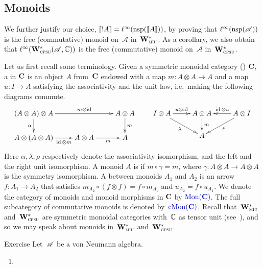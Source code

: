 \documentclass[a]{subfiles}
\begin{document}
\subsection{Monoids}
\label{sec:monoids-in-vna}
\begin{parsec}%
\begin{point}%
We further justify our choice,
$\llbracket!A\rrbracket = \ell^\infty(\mathrm{nsp}(\llbracket A\rrbracket))$,
by proving that $\ell^\infty(\mathrm{nsp}(\mathscr{A}))$
is the free (commutative) monoid on~$\mathscr{A}$ in~$\mathbf{W}^*_{\text{\textsc{miu}}}$.
As a corollary, we also obtain that $\ell^\infty(\mathbf{W}^*_{\text{\textsc{cpsu}}}(\mathscr{A},\mathbb{C}))$
is the free (commutative) monoid on~$\mathscr{A}$
in~$\mathbf{W}^*_{\text{\textsc{cpsu}}}$.
\end{point}
\begin{point}%
Let us first recall some terminology.
Given a symmetric monoidal
category ()
$\mathbf{C}$, 
a  in $\mathbf{C}$ is an object $A$ from~$\mathbf{C}$ endowed
with
a  map
$m\colon A\otimes A\to A$
and a  map $u\colon I\to A$
satisfying the associativity and the unit law,
i.e.~making the following diagrams commute.
\[
\xymatrix@R-.5pc{
(A\otimes A)\otimes A
\ar[d]_{\alpha}
\ar[rr]^-{m\otimes \id}
&&
A\otimes A
\ar[d]^{m}
\\
A\otimes (A\otimes A)
\ar[r]_-{\id\otimes m}
&
A\otimes A
\ar[r]_-{m}
&
A
}
\qquad
\xymatrix@R-.5pc{
I\otimes A
\ar[dr]_{\lambda}
\ar[r]^-{u\otimes \id}
&
A\otimes A
\ar[d]^{m}
&
\ar[l]_-{\id\otimes u}
A\otimes I
\ar[dl]^{\rho}
\\
&
A
&
}
\]
Here $\alpha,\lambda,\rho$ respectively
denote the associativity isomorphism, and
the left and the right unit isomorphism.
A monoid $A$ is  if
$m\circ \gamma=m$,
where $\gamma\colon A\otimes A\to A\otimes A$ is the symmetry isomorphism.
A  between monoids $A_1$
and $A_2$ is an arrow $f\colon A_1\to A_2$
that satisfies $m_{A_2}\circ (f\otimes f)=f \circ m_{A_1}$
and $u_{A_2}=f \circ u_{A_1}$.
We denote the category of monoids
and monoid morphisms in $\mathbf{C}$
by $\Define{\Mon(\Cat{C})}$.
The full subcategory of commutative
monoids is denoted by~$\Define{\CMon(\Cat{C})}$.
Recall that~$\mathbf{W}^*_{\text{\textsc{miu}}}$ and~$\mathbf{W}^*_{\text{\textsc{cpsu}}}$
are symmetric monoidal categories
with~$\mathbb{C}$ as tensor unit (see~),
and so we may speak about monoids
in~$\mathbf{W}^*_{\text{\textsc{miu}}}$ and~$\mathbf{W}^*_{\text{\textsc{cpsu}}}$.
\end{point}
\begin{point}{Exercise}%
Let~$\mathscr{A}$ be a von Neumann algebra.
\begin{enumerate}
\item

\end{enumerate}
\end{point}
\end{parsec}
\end{document}
